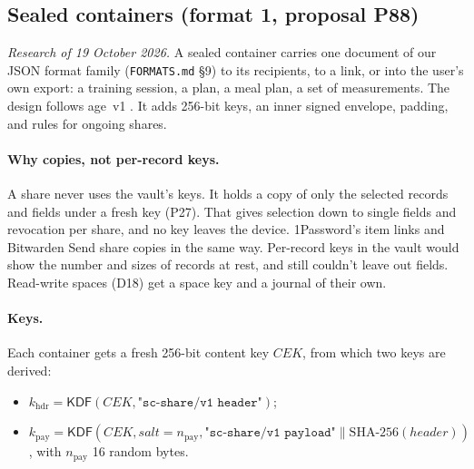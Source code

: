 \documentclass[11pt,a4paper]{article}
\newcommand{\concat}{\mathbin{\|}}
\newcommand{\KDF}{\mathsf{KDF}}
\newcommand{\str}[1]{\texttt{"#1"}}
\newcommand{\dref}[1]{\textsf{#1}} %
\begin{document}
\subsection{Sealed containers (format 1, proposal \dref{P88})}
\label{sec:sealed}
\emph{Research of 19 October 2026.} A sealed container carries one document of our JSON format family (\texttt{FORMATS.md} \S9) to its recipients, to a link, or into the user's own export: a training session, a plan, a meal plan, a set of measurements. The design follows age~v1 \cite{age}. It adds 256-bit keys, an inner signed envelope, padding, and rules for ongoing shares.

\paragraph{Why copies, not per-record keys.} A share never uses the vault's keys. It holds a copy of only the selected records and fields under a fresh key (\dref{P27}). That gives selection down to single fields and revocation per share, and no key leaves the device. 1Password's item links and Bitwarden Send share copies in the same way. Per-record keys in the vault would show the number and sizes of records at rest, and still couldn't leave out fields. Read-write spaces (\dref{D18}) get a space key and a journal of their own.

\paragraph{Keys.} Each container gets a fresh 256-bit content key $\mathit{CEK}$, from which two keys are derived:
\begin{itemize}
  \item $k_{\mathrm{hdr}} = \KDF(\mathit{CEK}, \str{sc-share/v1 header})$;
  \item $k_{\mathrm{pay}} = \KDF(\mathit{CEK}, \mathit{salt} = n_{\mathrm{pay}}, \str{sc-share/v1 payload} \concat \mathrm{SHA\text{-}256}(\mathit{header}))$, with $n_{\mathrm{pay}}$ 16 random bytes.
\end{itemize}
\end{document}

